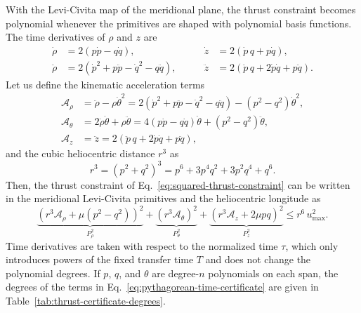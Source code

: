 \documentclass[a4paper,fleqn]{cas-sc}
\begin{document}
With the Levi-Civita map of the meridional plane, the thrust constraint
becomes polynomial whenever the primitives are shaped with polynomial basis
functions. The time derivatives of $\rho$ and $z$ are
\begin{equation}
	\begin{alignedat}{2}
		\dot \rho
		&=2(p\dot p-q\dot q),
		&\qquad
		\dot z
		&=2(\dot p\,q+p\dot q),
		\\
		\ddot \rho
		&=2\left(\dot p^{2}+p\ddot p
		-\dot q^{2}-q\ddot q\right),
		&\qquad
		\ddot z
		&=2\left(\ddot p\,q+2\dot p\dot q+p\ddot q\right).
	\end{alignedat}
	\label{eq:levi-civita-time-derivatives}
\end{equation}
Let us define the kinematic acceleration terms
\begin{equation}
	\begin{aligned}
		\mathcal A_\rho
		&=\ddot{\rho}-\rho\dot{\theta}^2=2\left(\dot p^{2}+p\ddot p
		-\dot q^{2}-q\ddot q\right)-(p^2-q^2)\dot{\theta}^2,\\
		\mathcal A_\theta
		&=2\dot{\rho}\dot{\theta}+\rho\ddot{\theta}=4(p\dot p-q\dot q)\dot{\theta}+(p^2-q^2)\ddot{\theta},\\
		\mathcal A_z
		&=\ddot{z}=2\left(\ddot p\,q+2\dot p\dot q+p\ddot q\right),
	\end{aligned}
	\label{eq:time-kinematic-terms}
\end{equation}
and the cubic heliocentric distance $r^3$ as
\begin{equation}
	r^3 = (p^2+q^2)^3=p^6+3p^4q^2+3p^2q^4+q^6.
	\label{eq:levi-civita-weight}
\end{equation}
Then, the thrust constraint of Eq.~\eqref{eq:squared-thrust-constraint} can
be written in the meridional Levi-Civita primitives and the heliocentric
longitude as
\begin{equation}
	\underbrace{
		\left(r^3\mathcal A_\rho+\mu (p^2-q^2)\right)^2
	}_{P_\rho^{2}}
	+
	\underbrace{
		\left(r^3\mathcal A_\theta\right)^2
	}_{P_\theta^{2}}
	+
	\underbrace{
		\left(r^3\mathcal A_z+2\mu pq\right)^2
	}_{P_z^{2}}
	\leq
	r^6\,u_{\max}^2.
	\label{eq:pythagorean-time-certificate}
\end{equation}
Time derivatives are taken with respect to the normalized time $\tau$, which
only introduces powers of the fixed transfer time $T$ and does not change the
polynomial degrees. If $p$, $q$, and $\theta$ are degree-$n$ polynomials on
each span, the degrees of the terms in
Eq.~\eqref{eq:pythagorean-time-certificate} are given in
Table~\ref{tab:thrust-certificate-degrees}.
\end{document}
